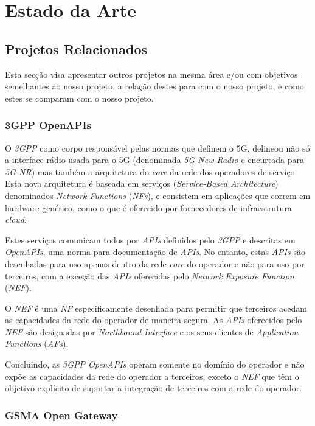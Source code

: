 \chapter{Estado da Arte}

\section{Projetos Relacionados}

Esta secção visa apresentar outros projetos na mesma área e/ou com objetivos
semelhantes ao nosso projeto, a relação destes para com o nosso projeto, e como
estes se comparam com o nosso projeto.

\subsection{3GPP OpenAPIs}\label{sec:related_work_3gpp}

O \emph{3GPP} como corpo responsável pelas normas que definem o 5G, delineou
não só a interface rádio usada para o 5G (denominada \emph{5G New Radio} e
encurtada para \emph{5G-NR}) mas também a arquitetura do \emph{core} da rede
dos operadores de serviço. Esta nova arquitetura é baseada em serviços
(\emph{Service-Based Architecture}) denominados \emph{Network Functions}
(\emph{NFs}), e consistem em aplicações que correm em hardware genérico, como o
que é oferecido por fornecedores de infraestrutura \emph{cloud}.

Estes serviços comunicam todos por \emph{APIs} definidos pelo \emph{3GPP} e
descritas em \emph{OpenAPIs}, uma norma para documentação de \emph{APIs}. No
entanto, estas \emph{APIs} são desenhadas para uso apenas dentro da rede
\emph{core} do operador e não para uso por terceiros, com a exceção das
\emph{APIs} oferecidas pelo \emph{Network Exposure Function} (\emph{NEF}).

O \emph{NEF} é uma \emph{NF} especificamente desenhada para permitir que
terceiros acedam as capacidades da rede do operador de maneira segura. As
\emph{APIs} oferecidos pelo \emph{NEF} são designadas por \emph{Northbound
	Interface} e os seus clientes de \emph{Application Functions} (\emph{AFs}).


Concluindo, as \emph{3GPP OpenAPIs} operam somente no domínio do operador e não
expõe as capacidades da rede do operador a terceiros, exceto o \emph{NEF} que
têm o objetivo explícito de suportar a integração de terceiros com a rede do
operador. 

\subsection{GSMA Open Gateway}

